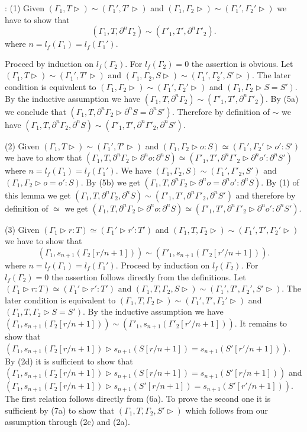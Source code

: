 \documentclass[11pt]{article}
\newenvironment{proof}{{\bf Proof}:}{\vskip 5mm }
\begin{document}
\begin{proof}
(1) Given $(\Gamma_1,T\rhd)\sim(\Gamma_1',T'\rhd)$ and $(\Gamma_1,\Gamma_2\rhd)\sim(\Gamma_1',\Gamma_2'\rhd)$ we have to show that 
%
$$(\Gamma_1,T,\partial^n\Gamma_2)\sim (\Gamma'_1,T',\partial^n\Gamma'_2).$$
%
where $n=l_f(\Gamma_1)=l_f(\Gamma_1')$.

Proceed by induction on $l_f(\Gamma_2)$. For $l_f(\Gamma_2)=0$ the assertion is obvious. Let  $(\Gamma_1,T\rhd)\sim(\Gamma_1',T'\rhd)$ and $(\Gamma_1,\Gamma_2,S\rhd)\sim(\Gamma_1',\Gamma_2',S'\rhd)$. The later condition is equivalent to $(\Gamma_1,\Gamma_2\rhd)\sim(\Gamma_1',\Gamma_2'\rhd)$  and $(\Gamma_1,\Gamma_2\rhd S=S')$. By the inductive assumption we have $(\Gamma_1,T,\partial^n\Gamma_2)\sim (\Gamma'_1,T',\partial^n\Gamma'_2)$. By (5a) we conclude that $(\Gamma_1,T,\partial^n\Gamma_2\rhd \partial^nS=\partial^nS')$. Therefore by definition of $\sim$ we have $(\Gamma_1,T,\partial^n\Gamma_2,\partial^nS)\sim(\Gamma'_1,T',\partial^n\Gamma'_2, \partial^nS')$.

(2) Given $(\Gamma_1,T\rhd)\sim(\Gamma_1',T'\rhd)$ and $(\Gamma_1,\Gamma_2\rhd o:S)\simeq(\Gamma_1',\Gamma_2'\rhd o':S')$ we have to show that $(\Gamma_1,T,\partial^n\Gamma_2\rhd \partial^no:\partial^nS)\simeq (\Gamma'_1,T',\partial^n\Gamma'_2\rhd \partial^no':\partial^nS')$ where $n=l_f(\Gamma_1)=l_f(\Gamma_1')$. We have $(\Gamma_1,\Gamma_2,S)\sim(\Gamma_1',\Gamma'_2,S')$ and $(\Gamma_1,\Gamma_2\rhd o=o':S)$. By (5b) we get $(\Gamma_1,T, \partial^n\Gamma_2\rhd \partial^no=\partial^no':\partial^nS)$. By (1) of this lemma we get $(\Gamma_1,T,\partial^n\Gamma_2,\partial^nS)\sim(\Gamma'_1,T',\partial^n\Gamma'_2,\partial^nS')$ and therefore by definition of $\simeq$ we get $(\Gamma_1,T,\partial^n\Gamma_2\rhd \partial^no:\partial^nS)\simeq (\Gamma'_1,T',\partial^n\Gamma'_2\rhd \partial^no':\partial^nS')$.

(3) Given $(\Gamma_1\rhd r:T)\simeq(\Gamma_1'\rhd r':T')$ and $(\Gamma_1,T,\Gamma_2\rhd)\sim(\Gamma_1',T',\Gamma_2'\rhd)$ we have to show that 
%
$$(\Gamma_1,s_{n+1}(\Gamma_2[r/n+1]))\sim(\Gamma'_1,s_{n+1}(\Gamma'_2[r'/n+1])).$$
%
where $n=l_f(\Gamma_1)=l_f(\Gamma_1')$. Proceed by induction on $l_f(\Gamma_2)$. For $l_f(\Gamma_2)=0$ the assertion follows directly from the definitions. Let $(\Gamma_1\rhd r:T)\simeq(\Gamma_1'\rhd r':T')$ and $(\Gamma_1,T,\Gamma_2,S\rhd)\sim(\Gamma_1',T',\Gamma_2',S'\rhd)$. The later condition is equivalent to $(\Gamma_1,T,\Gamma_2\rhd)\sim(\Gamma_1',T',\Gamma_2'\rhd)$  and $(\Gamma_1,T,\Gamma_2\rhd S=S')$. By the inductive assumption we have $(\Gamma_1,s_{n+1}(\Gamma_2[r/n+1]))\sim(\Gamma'_1,s_{n+1}(\Gamma'_2[r'/n+1]))$. It remains to show that $(\Gamma_1,s_{n+1}(\Gamma_2[r/n+1])\rhd s_{n+1}(S[r/n+1])=s_{n+1}(S'[r'/n+1]))$. By (2d) it is sufficient to show that $(\Gamma_1,s_{n+1}(\Gamma_2[r/n+1])\rhd s_{n+1}(S[r/n+1])=s_{n+1}(S'[r/n+1]))$ and $(\Gamma_1,s_{n+1}(\Gamma_2[r/n+1])\rhd s_{n+1}(S'[r/n+1])=s_{n+1}(S'[r'/n+1]))$. The first relation follows directly from (6a). To prove the second one it is sufficient by (7a) to show that $(\Gamma_1,T,\Gamma_2,S'\rhd)$ which follows from our assumption through (2c) and (2a). 


\end{proof}
\end{document}

